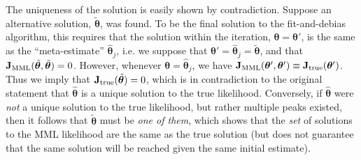 \documentclass[a4paper,fleqn,usenatbib]{mnras}
\newcommand{\para}{{\bm{\theta}}}
\begin{document}
The uniqueness of the solution is easily shown by contradiction. 
Suppose an alternative solution, $\tilde{\para}$, was found. 
To be the final solution to the fit-and-debias algorithm, this requires that the solution within the iteration, $\para = \para'$, is the same as the ``meta-estimate'' $\hat{\para}_j$, i.e. we suppose that $\para' = \hat{\para}_j = \tilde{\para}$, and that $\mathbf{J}_{\rm MML}(\tilde{\para},\tilde{\para}) = 0$. 
However, whenever $\para = \hat{\para}_j$, we have $\mathbf{J}_{\rm MML}(\para',\para') \equiv \mathbf{J}_{\rm true}(\para')$.
Thus we imply that $\mathbf{J}_{\rm true}(\tilde{\para}) = 0$, which is in contradiction to the original statement that $\hat{\para}$ is a unique solution to the true likelihood. 
Conversely, if $\hat{\para}$ were \textit{not} a unique solution to the true likelihood, but rather multiple peaks existed, then it follows that $\tilde{\para}$ must be \textit{one of them}, which shows that the \textit{set} of solutions to the MML likelihood are the same as the true solution (but does not guarantee that the same solution will be reached given the same initial estimate).
\end{document}
